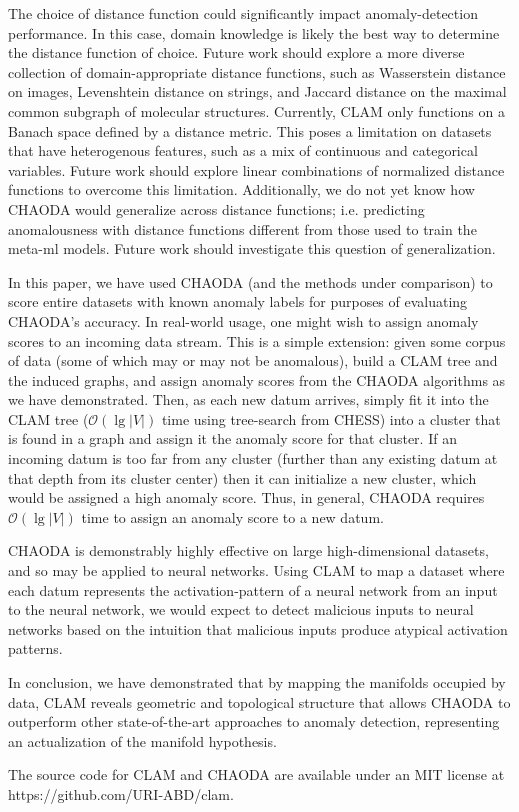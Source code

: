 The choice of distance function could significantly impact anomaly-detection performance.
In this case, domain knowledge is likely the best way to determine the distance function of choice.
Future work should explore a more diverse collection of domain-appropriate distance functions, such as Wasserstein distance on images, Levenshtein distance on strings, and Jaccard distance on the maximal common subgraph of molecular structures.
Currently, CLAM only functions on a Banach space defined by a distance metric.
This poses a limitation on datasets that have heterogenous features, such as a mix of continuous and categorical variables.
Future work should explore linear combinations of normalized distance functions to overcome this limitation.
Additionally, we do not yet know how CHAODA would generalize across distance functions; i.e. predicting anomalousness with distance functions different from those used to train the meta-ml models.
Future work should investigate this question of generalization.

In this paper, we have used CHAODA (and the methods under comparison) to score entire datasets with known anomaly labels for purposes of evaluating CHAODA's accuracy.
In real-world usage, one might wish to assign anomaly scores to an incoming data stream.
This is a simple extension: given some corpus of data (some of which may or may not be anomalous), build a CLAM tree and the induced graphs, and assign anomaly scores from the CHAODA algorithms as we have demonstrated.
Then, as each new datum arrives, simply fit it into the CLAM tree ($\mathcal{O}(\lg |V|)$ time using tree-search from CHESS) into a cluster that is found in a graph and assign it the anomaly score for that cluster.
If an incoming datum is too far from any cluster (further than any existing datum at that depth from its cluster center) then it can initialize a new cluster, which would be assigned a high anomaly score.
Thus, in general, CHAODA requires $\mathcal{O}(\lg |V|)$ time to assign an anomaly score to a new datum.


CHAODA is demonstrably highly effective on large high-dimensional datasets, and so may be applied to neural networks.
Using CLAM to map a dataset where each datum represents the activation-pattern of a neural network from an input to the neural network, we would expect to detect malicious inputs to neural networks based on the intuition that malicious inputs produce atypical activation patterns.

In conclusion, we have demonstrated that by mapping the manifolds occupied by data, CLAM reveals geometric and topological structure that allows CHAODA to outperform other state-of-the-art approaches to anomaly detection, representing an actualization of the manifold hypothesis.

The source code for CLAM and CHAODA are available under an MIT license at https://github.com/URI-ABD/clam.
